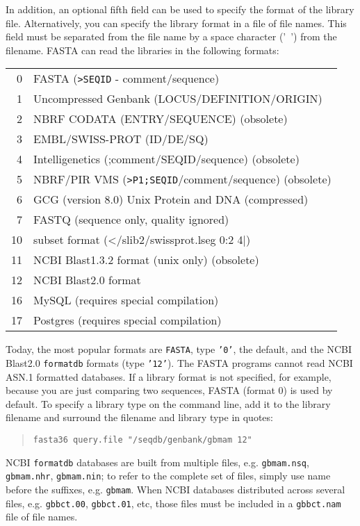 \documentclass[11pt]{article}
\begin{document}
In addition, an optional fifth field can be used to specify the format
of the library file.  Alternatively, you can specify the library
format in a file of file names.  This field must be separated from the
file name by a space character ('\ ') from the filename.  FASTA can
read the libraries in the following formats:\\

\begin{tabular}{r l}
0 & FASTA (\texttt{>SEQID} - comment/sequence) \\
1 & Uncompressed Genbank (LOCUS/DEFINITION/ORIGIN)\\
2 & NBRF CODATA (ENTRY/SEQUENCE) (obsolete)\\
3 & EMBL/SWISS-PROT (ID/DE/SQ)\\
4 & Intelligenetics (;comment/SEQID/sequence) (obsolete)\\
5 & NBRF/PIR VMS (\texttt{>P1;SEQID}/comment/sequence) (obsolete)\\
6 & GCG (version 8.0) Unix Protein and DNA (compressed)\\
7 & FASTQ (sequence only, quality ignored)\\
10 & subset format (</slib2/swissprot.lseg 0:2 4|) \\
11 & NCBI Blast1.3.2 format  (unix only) (obsolete)\\
12 & NCBI Blast2.0 format\\
16 & MySQL (requires special compilation) \\
17 & Postgres (requires special compilation) \\
\end{tabular}

Today, the most popular formats are \texttt{FASTA}, type \texttt{'0'},
the default, and the NCBI Blast2.0 \texttt{formatdb} formats (type
\texttt{'12'}).  The FASTA programs cannot read NCBI ASN.1 formatted databases.
If a library format is not specified, for example, because
you are just comparing two sequences, FASTA (format 0) is used by
default. To specify a library type on the command line, add it to the
library filename and surround the filename and library type in quotes:
\begin{quote}
\begin{verbatim}
fasta36 query.file "/seqdb/genbank/gbmam 12"
\end{verbatim}
\end{quote}
NCBI \texttt{formatdb} databases are built from multiple files,
e.g. \texttt{gbmam.nsq}, \texttt{gbmam.nhr}, \texttt{gbmam.nin}; to
refer to the complete set of files, simply use name before the
suffixes, e.g. \texttt{gbmam}.  When NCBI databases distributed across
several files, e.g. \texttt{gbbct.00}, \texttt{gbbct.01}, etc, those
files must be included in a \texttt{gbbct.nam} file of file names.
\end{document}
